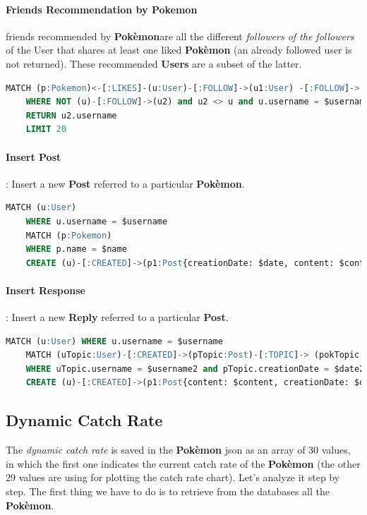 \paragraph{Friends Recommendation by Pokemon} friends recommended by \textbf{Pokèmon}are all the different \textit{followers of the followers} of the User that shares at least one liked \textbf{Pokèmon} (an already followed user is not returned). These recommended \textbf{Users} are a subset of the latter.
\begin{lstlisting}[language=SQL]
	MATCH (p:Pokemon)<-[:LIKES]-(u:User)-[:FOLLOW]->(u1:User) -[:FOLLOW]->(u2:User)-[:LIKES]->(p2:Pokemon) 
	WHERE NOT (u)-[:FOLLOW]->(u2) and u2 <> u and u.username = $username and p2 = p 
	RETURN u2.username 
	LIMIT 20
\end{lstlisting}


\paragraph{Insert Post}: Insert a new \textbf{Post} referred to a particular \textbf{Pokèmon}.
\begin{lstlisting}[language=SQL]
	MATCH (u:User) 
	WHERE u.username = $username 
	MATCH (p:Pokemon) 
	WHERE p.name = $name 
	CREATE (u)-[:CREATED]->(p1:Post{creationDate: $date, content: $content})-[:TOPIC]->(p)
\end{lstlisting}

\paragraph{Insert Response}: Insert a new \textbf{Reply} referred to a particular \textbf{Post}.
\begin{lstlisting}[language=SQL]
	MATCH (u:User) WHERE u.username = $username 
	MATCH (uTopic:User)-[:CREATED]->(pTopic:Post)-[:TOPIC]-> (pokTopic:Pokemon)
	WHERE uTopic.username = $username2 and pTopic.creationDate = $date2 and pTopic.content = $content2 and pokTopic.name = $name2
	CREATE (u)-[:CREATED]->(p1:Post{content: $content, creationDate: $date})-[:TOPIC]->(pTopic)
\end{lstlisting}




\subsection{Dynamic Catch Rate}
The \textit{dynamic catch rate} is saved in the \textbf{Pokèmon} json as an array of 30 values, in which the first one indicates the current catch rate of the \textbf{Pokèmon} (the other 29 values are using for plotting the catch rate chart). Let’s analyze it step by step.
The first thing we have to do is to retrieve from the databases all the \textbf{Pokèmon}.



